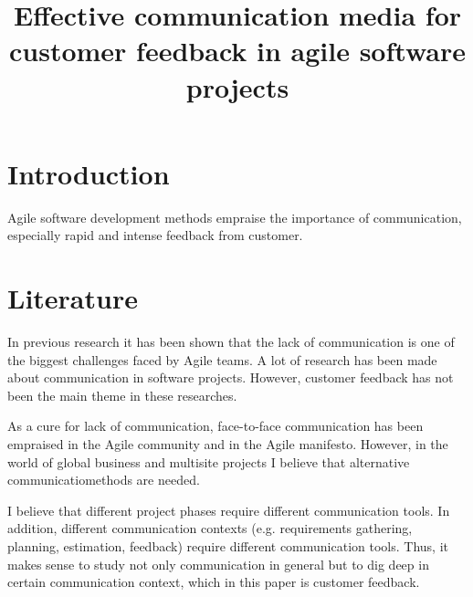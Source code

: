 \documentclass[a4paper]{article}
\begin{document}
\title{\huge Effective communication media for customer feedback in agile software projects}
\date{\vspace{-5ex}}
\maketitle

\large

\section{Introduction}
Agile software development methods empraise the importance of communication, especially rapid and intense feedback from customer.

\begin{comment}
Why is this research important? Is there a bigger phenomenon that this research of yours is part of? Why people in your profession should care about this thesis?
\end{comment}

\section{Literature}
In previous research it has been shown that the lack of communication is one of the biggest challenges faced by Agile teams. A lot of research has been made about communication in software projects. However, customer feedback has not been the main theme in these researches.

As a cure for lack of communication, face-to-face communication has been empraised in the Agile community and in the Agile manifesto. However, in the world of global business and multisite projects I believe that alternative communicatiomethods are needed.

I believe that different project phases require different communication tools. In addition, different communication contexts (e.g. requirements gathering, planning, estimation, feedback) require different communication tools. Thus, it makes sense to study not only communication in general but to dig deep in certain communication context, which in this paper is customer feedback.

\begin{comment}
What has been done related to this (mainly in academic publications)? What do the authors say about the topic? How does your research question relate to these previous studies? How do you apply them or add to them? Based on what they say, what do you say?
\end{comment}
\end{document}
